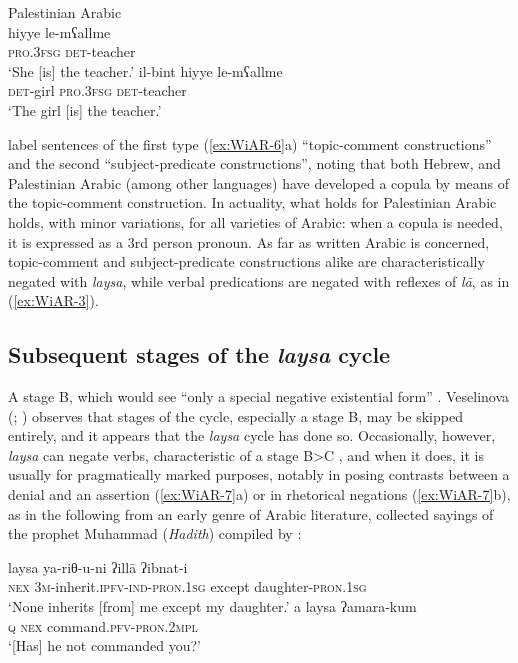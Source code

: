 \documentclass[output=paper]{langsci/langscibook}
\begin{document}
\ea Palestinian Arabic \citep[431]{li1977a}\label{ex:WiAR-6}\\
  \ea
  	\gll hiyye le-mʕallme\\
  	\textsc{pro.3fsg} \textsc{det}-teacher\\
  	\glt‘She [is] the teacher.’
  \ex
  	\gll il-bint hiyye le-mʕallme\\
  	\textsc{det}-girl \textsc{pro.3fsg} \textsc{det}-teacher\\
  	\glt ‘The girl [is] the teacher.’
\z \z

\citet[420]{li1977a} label sentences of the first type (\ref{ex:WiAR-6}a) “topic-comment constructions” and the second “subject-predicate constructions”, noting that both Hebrew, and Palestinian Arabic (among other languages) have developed a copula by means of the topic-comment construction. In actuality, what holds for Palestinian Arabic holds, with minor variations, for all varieties of Arabic: when a copula is needed, it is expressed as a 3rd person pronoun. As far as written Arabic is concerned, topic-comment and subject-predicate constructions alike are characteristically negated with \textit{laysa}, while verbal predications are negated with reflexes of \textit{lā}, as in (\ref{ex:WiAR-3}). 

\subsection{Subsequent stages of the \textit{laysa} cycle} \label{s:WiAR-2.3}

A stage B, which would see “only a special negative existential form” \citep[9]{Croft1991}. Veselinova (\citeyear[1338]{Veselinova2014}; \citeyear[153]{Veselinova2016}) observes that stages of the cycle, especially a stage B, may be skipped entirely, and it appears that the \textit{laysa} cycle has done so. Occasionally, however, \textit{laysa} can negate verbs, characteristic of a stage B>C \citep[9--10]{Croft1991}, and when it does, it is usually for pragmatically marked purposes, notably in posing contrasts between a denial and an assertion (\ref{ex:WiAR-7}a) or in rhetorical negations (\ref{ex:WiAR-7}b), as in the following from an early genre of Arabic literature, collected sayings of the prophet Muhammad (\textit{Hadith}) compiled by \citet[d. 870]{al-bu2000a}:

\ea \label{ex:WiAR-7}
  \ea
  	\gll laysa ya-riθ-u-ni ʔillā ʔibnat-i\\
  	\textsc{nex} \textsc{3m}-inherit.\textsc{ipfv-ind-pron.1sg} except daughter-\textsc{pron.1sg}\\
  	\glt ‘None inherits [from] me except my daughter.’ \citep[Vol. VIII p. 151]{al-bu2000a}
  \ex
  	\gll a laysa ʔamara-kum\\
  	\textsc{q} \textsc{nex} command.\textsc{pfv-pron.2mpl}\\
  	\glt ‘[Has] he not commanded you?’ \citep[Vol. VI p. 864]{al-bu2000a}
\z \z
\end{document}
